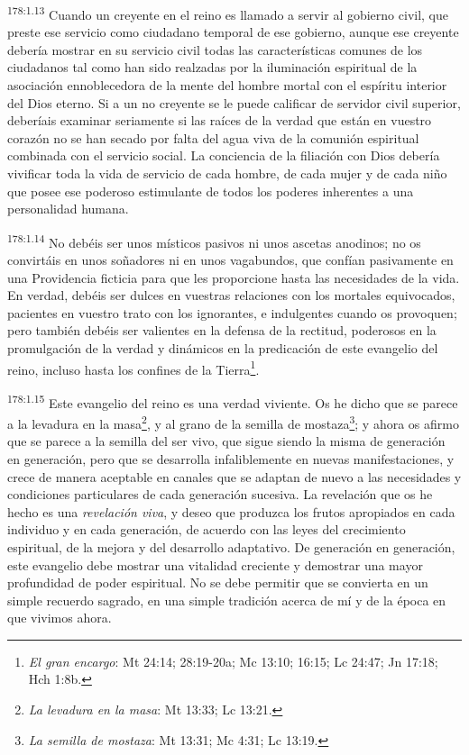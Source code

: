 \par 
\textsuperscript{178:1.13} Cuando un creyente en el reino es llamado a servir al gobierno civil, que preste ese servicio como ciudadano temporal de ese gobierno, aunque ese creyente debería mostrar en su servicio civil todas las características comunes de los ciudadanos tal como han sido realzadas por la iluminación espiritual de la asociación ennoblecedora de la mente del hombre mortal con el espíritu interior del Dios eterno. Si a un no creyente se le puede calificar de servidor civil superior, deberíais examinar seriamente si las raíces de la verdad que están en vuestro corazón no se han secado por falta del agua viva de la comunión espiritual combinada con el servicio social. La conciencia de la filiación con Dios debería vivificar toda la vida de servicio de cada hombre, de cada mujer y de cada niño que posee ese poderoso estimulante de todos los poderes inherentes a una personalidad humana.

\par 
\textsuperscript{178:1.14} No debéis ser unos místicos pasivos ni unos ascetas anodinos; no os convirtáis en unos soñadores ni en unos vagabundos, que confían pasivamente en una Providencia ficticia para que les proporcione hasta las necesidades de la vida. En verdad, debéis ser dulces en vuestras relaciones con los mortales equivocados, pacientes en vuestro trato con los ignorantes, e indulgentes cuando os provoquen; pero también debéis ser valientes en la defensa de la rectitud, poderosos en la promulgación de la verdad y dinámicos en la predicación de este evangelio del reino, incluso hasta los confines de la Tierra\footnote{\textit{El gran encargo}: Mt 24:14; 28:19-20a; Mc 13:10; 16:15; Lc 24:47; Jn 17:18; Hch 1:8b.}.

\par 
\textsuperscript{178:1.15} Este evangelio del reino es una verdad viviente. Os he dicho que se parece a la levadura en la masa\footnote{\textit{La levadura en la masa}: Mt 13:33; Lc 13:21.}, y al grano de la semilla de mostaza\footnote{\textit{La semilla de mostaza}: Mt 13:31; Mc 4:31; Lc 13:19.}; y ahora os afirmo que se parece a la semilla del ser vivo, que sigue siendo la misma de generación en generación, pero que se desarrolla infaliblemente en nuevas manifestaciones, y crece de manera aceptable en canales que se adaptan de nuevo a las necesidades y condiciones particulares de cada generación sucesiva. La revelación que os he hecho es una \textit{revelación viva}, y deseo que produzca los frutos apropiados en cada individuo y en cada generación, de acuerdo con las leyes del crecimiento espiritual, de la mejora y del desarrollo adaptativo. De generación en generación, este evangelio debe mostrar una vitalidad creciente y demostrar una mayor profundidad de poder espiritual. No se debe permitir que se convierta en un simple recuerdo sagrado, en una simple tradición acerca de mí y de la época en que vivimos ahora.

